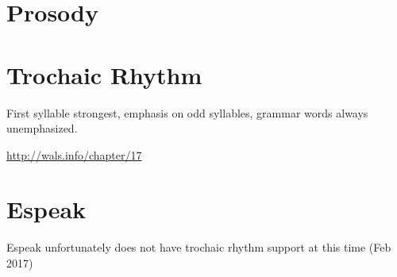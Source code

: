 \section{Prosody}
\section{Trochaic Rhythm}
First syllable strongest, 
emphasis on odd syllables,
grammar words always unemphasized. 

\url{http://wals.info/chapter/17}

\section{Espeak}
Espeak unfortunately does not have trochaic rhythm support at this time (Feb
2017) 
